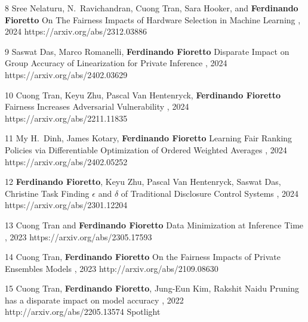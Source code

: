 \documentclass[localFont,alternative]{documentMETADATA}
\begin{document}
\begin{pubs}
\confentryShort
	{8}
	{Sree Nelaturu, N.~Ravichandran, Cuong Tran, Sara Hooker, and {\bf Ferdinando Fioretto}}
	{On The Fairness Impacts of Hardware Selection in Machine Learning}	
	{\procICML, 2024}
	{https://arxiv.org/abs/2312.03886}

\confentryShort
	{9}
	{Saswat Das, Marco Romanelli, {\bf Ferdinando Fioretto}}
	{Disparate Impact on Group Accuracy of Linearization for Private Inference}
	{\procICML, 2024}
	{https://arxiv.org/abs/2402.03629}
	

\confentryShort
	{10}%
	{Cuong Tran, Keyu Zhu, Pascal Van Hentenryck, {\bf Ferdinando Fioretto}}
	{Fairness Increases Adversarial Vulnerability}
	{\procIJCAI, 2024}
	{https://arxiv.org/abs/2211.11835}

\confentryShort
	{11}
	{My H.~Dinh, James Kotary, {\bf Ferdinando Fioretto}}
	{Learning Fair Ranking Policies via Differentiable Optimization of Ordered Weighted Averages}
	{\procFAccT, 2024}
	{https://arxiv.org/abs/2402.05252}

\confentryShort
	{12}
	{{\bf Ferdinando Fioretto}, Keyu Zhu, Pascal Van Hentenryck, Saswat Das, Christine Task}
	{Finding $\epsilon$ and $\delta$ of Traditional Disclosure Control Systems}
	{\procAAAI, 2024}
	{https://arxiv.org/abs/2301.12204}

\confentryShort
	{13}
	{{Cuong Tran} and {\bf Ferdinando Fioretto}}
	{Data Minimization at Inference Time}
	{\procNeurIPS, 2023}
	{https://arxiv.org/abs/2305.17593}


\confentryShort
  {14} %
	{{Cuong Tran}, {\bf Ferdinando Fioretto}}
	{On the Fairness Impacts of Private Ensembles Models}
    {\procIJCAI, 2023}
	{http://arxiv.org/abs/2109.08630}

\confentryShortAwd
	{15} %
	{{Cuong Tran}, {\bf Ferdinando Fioretto}, Jung-Eun Kim, {Rakshit Naidu}}
	{Pruning has a disparate impact on model accuracy}
	{\procNeurIPS, 2022}
	{http://arxiv.org/abs/2205.13574}
	{Spotlight}


\end{pubs}
\end{document}
